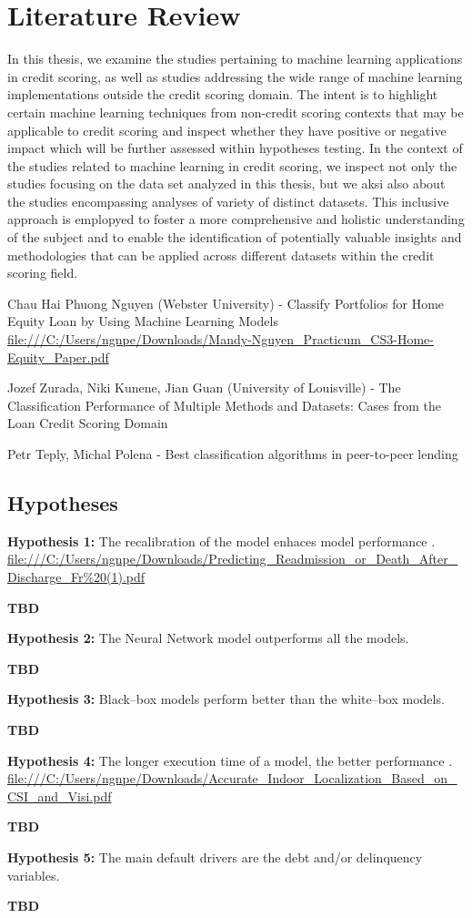 \chapter{Literature Review}
\label{chap:three}

In this thesis, we examine the studies pertaining to machine learning applications in credit scoring, as well as studies addressing the wide range of machine learning implementations outside the credit scoring domain. The intent is to highlight certain machine learning techniques from non-credit scoring contexts that may be applicable to credit scoring and inspect whether they have positive or negative impact which will be further assessed within hypotheses testing.
In the context of the studies related to machine learning in credit scoring, we inspect not only the studies focusing on the data set analyzed in this thesis, but we aksi  also about the studies encompassing analyses of variety of distinct datasets.
This inclusive approach is emplopyed to foster a more comprehensive and holistic understanding of the subject and to enable the identification of potentially valuable insights and methodologies that can be applied across different datasets within the credit scoring field.

Chau Hai Phuong Nguyen (Webster University) - Classify Portfolios for Home Equity Loan by Using Machine Learning Models \url{file:///C:/Users/ngnpe/Downloads/Mandy-Nguyen_Practicum_CS3-Home-Equity_Paper.pdf}

Jozef Zurada, Niki Kunene, Jian Guan (University of Louisville) - The Classification Performance of Multiple Methods and
Datasets: Cases from the Loan Credit Scoring Domain

Petr Teply, Michal Polena - Best classification algorithms in peer-to-peer lending

\section{Hypotheses}

\noindent \textbf{Hypothesis 1:} The recalibration of the model enhaces model performance \citep{de2023predicting}.
\url{file:///C:/Users/ngnpe/Downloads/Predicting_Readmission_or_Death_After_Discharge_Fr%20(1).pdf}

\textbf{TBD}

\noindent \textbf{Hypothesis 2:} The Neural Network model outperforms all the models.

\textbf{TBD}

\noindent \textbf{Hypothesis 3:} Black--box models perform better than the white--box models.

\textbf{TBD}

\noindent \textbf{Hypothesis 4:} The longer execution time of a model, the better performance \citep{wu2018accurate}.
\url{file:///C:/Users/ngnpe/Downloads/Accurate_Indoor_Localization_Based_on_CSI_and_Visi.pdf}

\textbf{TBD}

\noindent \textbf{Hypothesis 5:} The main default drivers are the debt and/or delinquency variables.

\textbf{TBD}